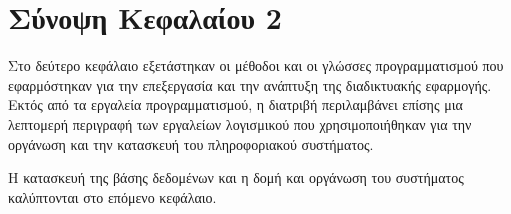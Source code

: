 \section{Σύνοψη Κεφαλαίου 2}
Στο δεύτερο κεφάλαιο εξετάστηκαν οι μέθοδοι και οι γλώσσες προγραμματισμού που εφαρμόστηκαν για την επεξεργασία και την ανάπτυξη της διαδικτυακής εφαρμογής. Εκτός από τα εργαλεία προγραμματισμού, η διατριβή περιλαμβάνει επίσης μια λεπτομερή περιγραφή των εργαλείων λογισμικού που χρησιμοποιήθηκαν για την οργάνωση και την κατασκευή του πληροφοριακού συστήματος. 

Η κατασκευή της βάσης δεδομένων και η δομή και οργάνωση του συστήματος καλύπτονται στο επόμενο κεφάλαιο.

